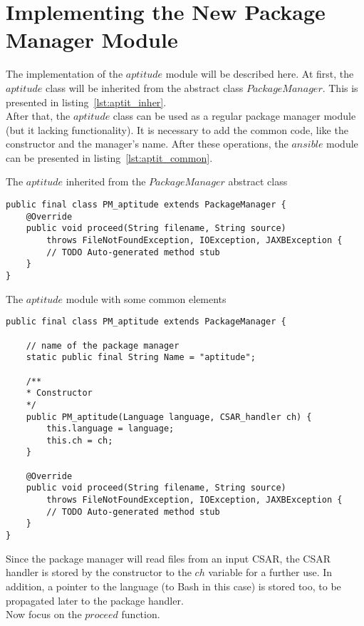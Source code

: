 \section{Implementing the New Package Manager Module}\label{sec:aptitude_imp}
The implementation of the $aptitude$ module will be described here.
At first, the $aptitude$ class will be inherited from the abstract class $PackageManager$. 
This is presented in listing~\ref{lst:aptit_inher}.\\
After that, the $aptitude$ class can be used as a regular package manager module (but it lacking functionality).
It is necessary to add the common code, like the constructor and the manager's name.
After these operations, the $ansible$ module can be presented in listing~\ref{lst:aptit_common}.\\
\begin{Listing} 
	\caption{The $aptitude$ inherited from the $PackageManager$ abstract class}
	\label{lst:aptit_inher}
\begin{lstlisting}
public final class PM_aptitude extends PackageManager {
	@Override
	public void proceed(String filename, String source)
		throws FileNotFoundException, IOException, JAXBException {
		// TODO Auto-generated method stub
	}
}
\end{lstlisting}
\end{Listing} 
\begin{Listing} 
\caption{The $aptitude$ module with some common elements}
\label{lst:aptit_common}
\begin{lstlisting}
public final class PM_aptitude extends PackageManager {

	// name of the package manager
	static public final String Name = "aptitude";
	
	/**
	* Constructor
	*/
	public PM_aptitude(Language language, CSAR_handler ch) {
		this.language = language;
		this.ch = ch;
	}
	
	@Override
	public void proceed(String filename, String source)
		throws FileNotFoundException, IOException, JAXBException {
		// TODO Auto-generated method stub
	}
}
\end{lstlisting}
\end{Listing} 
Since the package manager will read files from an input CSAR, the CSAR handler is stored by the constructor to the $ch$ variable for a further use.
In addition, a pointer to the language (to Bash in this case) is stored too, to be propagated later to the package handler.\\
Now focus on the $proceed$ function.
